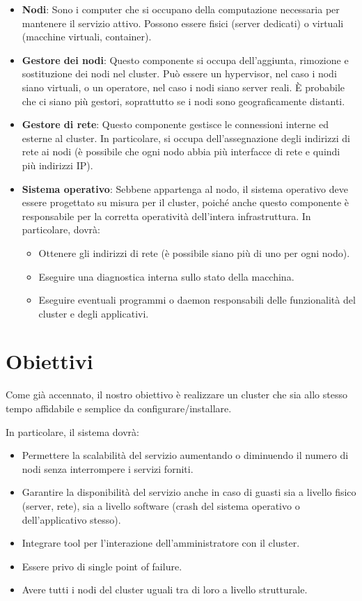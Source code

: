 \documentclass[acmtog]{acmart}
\begin{document}
\begin{itemize}
    \item \textbf{Nodi}: Sono i computer che si occupano della computazione necessaria per mantenere il servizio attivo. Possono essere fisici (server dedicati) o virtuali (macchine virtuali, container).
    \item \textbf{Gestore dei nodi}: Questo componente si occupa dell'aggiunta, rimozione e sostituzione dei nodi nel cluster. Può essere un hypervisor, nel caso i nodi siano virtuali, o un operatore, nel caso i nodi siano server reali. È probabile che ci siano più gestori, soprattutto se i nodi sono geograficamente distanti.
    \item \textbf{Gestore di rete}: Questo componente gestisce le connessioni interne ed esterne al cluster. In particolare, si occupa dell'assegnazione degli indirizzi di rete ai nodi (è possibile che ogni nodo abbia più interfacce di rete e quindi più indirizzi IP).
    \item \textbf{Sistema operativo}: Sebbene appartenga al nodo, il sistema operativo deve essere progettato su misura per il cluster, poiché anche questo componente è responsabile per la corretta operatività dell'intera infrastruttura. In particolare, dovrà:
    \begin{itemize}
        \item Ottenere gli indirizzi di rete (è possibile siano più di uno per ogni nodo).
        \item Eseguire una diagnostica interna sullo stato della macchina.
        \item Eseguire eventuali programmi o daemon responsabili delle funzionalità del cluster e degli applicativi.
    \end{itemize}
\end{itemize}

\section{Obiettivi}
Come già accennato, il nostro obiettivo è realizzare un cluster che sia allo stesso tempo affidabile e semplice da configurare/installare.

In particolare, il sistema dovrà:
\begin{itemize}
    \item Permettere la scalabilità del servizio aumentando o diminuendo il numero di nodi senza interrompere i servizi forniti.
    \item Garantire la disponibilità del servizio anche in caso di guasti sia a livello fisico (server, rete), sia a livello software (crash del sistema operativo o dell'applicativo stesso).
    \item Integrare tool per l'interazione dell'amministratore con il cluster.
    \item Essere privo di single point of failure.
    \item Avere tutti i nodi del cluster uguali tra di loro a livello strutturale.
\end{itemize}
\end{document}
